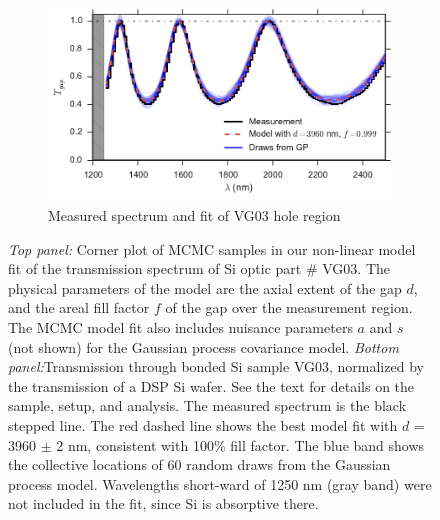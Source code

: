 \documentclass[osajnl,preprint,showpacs,superscriptaddress,12pt]{revtex4-1} %
\begin{document}
\begin{figure}[htbp]
        \begin{subfigure}[b]{0.5\textwidth}
                \includegraphics[width=\textwidth]{figs/VG03_f100.pdf}
                \caption{Measured spectrum and fit of VG03 hole region}
                \label{figVG03_f100}
        \end{subfigure}
\caption{ \emph{Top panel:} Corner plot of MCMC samples in our non-linear model fit of the transmission spectrum of Si optic part \# VG03.  The physical parameters of the model are the axial extent of the gap $d$, and the areal fill factor $f$ of the gap over the measurement region.  The MCMC model fit also includes nuisance parameters $a$ and $s$ (not shown) for the Gaussian process covariance model.  \emph{Bottom panel:}Transmission through bonded Si sample VG03, normalized by the transmission of a DSP Si wafer. See the text for details on the sample, setup, and analysis.  The measured spectrum is the black stepped line.  The red dashed line shows the best model fit with $d$ = 3960 $\pm$ 2 nm, consistent with 100\% fill factor.  The blue band shows the collective locations of 60 random draws from the Gaussian process model.  Wavelengths short-ward of 1250 nm (gray band) were not included in the fit, since Si is absorptive there.\label{figVG03full} }
\end{figure}
\end{document}
